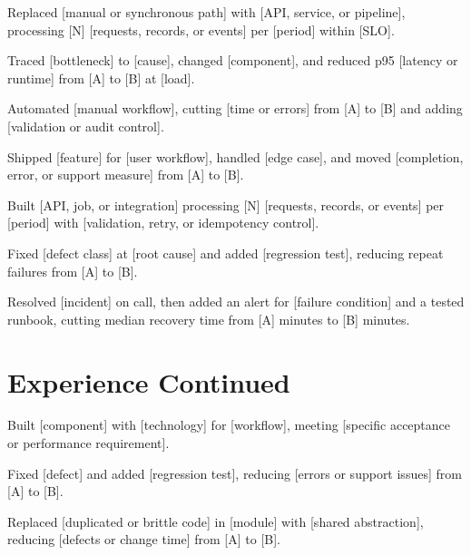 \documentclass{resume}
\begin{document}
\begin{jobduties}
  \item Replaced [manual or synchronous path] with [API, service, or pipeline], processing [N] [requests, records, or events] per [period] within [SLO].
  \item Traced [bottleneck] to [cause], changed [component], and reduced p95 [latency or runtime] from [A] to [B] at [load].
  \item Automated [manual workflow], cutting [time or errors] from [A] to [B] and adding [validation or audit control].
\end{jobduties}

\begin{jobduties}
  \item Shipped [feature] for [user workflow], handled [edge case], and moved [completion, error, or support measure] from [A] to [B].
  \item Built [API, job, or integration] processing [N] [requests, records, or events] per [period] with [validation, retry, or idempotency control].
  \item Fixed [defect class] at [root cause] and added [regression test], reducing repeat failures from [A] to [B].
  \item Resolved [incident] on call, then added an alert for [failure condition] and a tested runbook, cutting median recovery time from [A] minutes to [B] minutes.
\end{jobduties}

\newpage

\section{Experience Continued}

\begin{jobduties}
  \item Built [component] with [technology] for [workflow], meeting [specific acceptance or performance requirement].
  \item Fixed [defect] and added [regression test], reducing [errors or support issues] from [A] to [B].
  \item Replaced [duplicated or brittle code] in [module] with [shared abstraction], reducing [defects or change time] from [A] to [B].
\end{jobduties}
\end{document}
